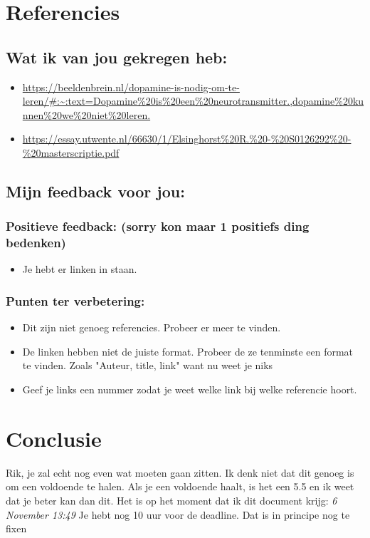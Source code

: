 \documentclass{article}
\begin{document}
    \newpage

    \section*{Referencies}
        \subsection*{Wat ik van jou gekregen heb:}
            {\itshape      
                \begin{itemize}
                    \item \url{https://beeldenbrein.nl/dopamine-is-nodig-om-te-leren/#:~:text=Dopamine%20is%20een%20neurotransmitter.,dopamine%20kunnen%20we%20niet%20leren.}
                    \item \url{https://essay.utwente.nl/66630/1/Elsinghorst%20R.%20-%20S0126292%20-%20masterscriptie.pdf }
                \end{itemize}
            }

        \bigskip

        \subsection*{Mijn feedback voor jou:}
            \subsubsection*{Positieve feedback: (sorry kon maar 1 positiefs ding bedenken)}
                \begin{itemize}
                \item Je hebt er linken in staan.
            \end{itemize}
            \subsubsection*{Punten ter verbetering:}
            \begin{itemize}
                \item Dit zijn niet genoeg referencies. Probeer er meer te vinden.
                \item De linken hebben niet de juiste format. Probeer de ze tenminste een format te vinden. Zoals "Auteur, title, link" want nu weet je niks
                \item Geef je links een nummer zodat je weet welke link bij welke referencie hoort.
            \end{itemize}

    \newpage

    \section*{Conclusie}
        Rik, je zal echt nog even wat moeten gaan zitten. Ik denk niet dat dit genoeg is om een voldoende te halen. Als je een voldoende haalt, is het een 5.5 en ik weet dat je beter kan dan dit. Het is op het moment dat ik dit document krijg: \textit{6 November 13:49} Je hebt nog 10 uur voor de deadline. Dat is in principe nog te fixen
                
\end{document}
